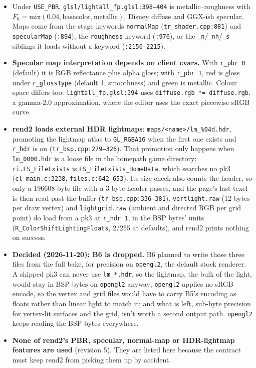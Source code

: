 \documentclass[11pt,a4paper]{article}
\begin{document}
\begin{itemize}
\item Under \texttt{USE\_PBR}, \texttt{glsl/lightall\_fp.glsl:398--404} is metallic--roughness with
  $F_0 = \mathrm{mix}(0.04, \text{basecolor}, \text{metallic})$, Disney diffuse and GGX-ish
  specular. Maps come from the stage keywords \texttt{normalMap} (\texttt{tr\_shader.cpp:881}) and
  \texttt{specularMap} (\texttt{:894}), the \texttt{roughness} keyword (\texttt{:976}), or the
  \texttt{\_n}/\texttt{\_nh}/\texttt{\_s} siblings it loads without a keyword (\texttt{:2150--2215}).
\item \textbf{Specular map interpretation depends on client cvars.} With \texttt{r\_pbr 0} (default)
  it is RGB reflectance plus alpha gloss; with \texttt{r\_pbr 1}, red is gloss under
  \texttt{r\_glossType} (default 1, smoothness) and green is metallic. Colour space differs too:
  \texttt{lightall\_fp.glsl:394} uses \texttt{diffuse.rgb *= diffuse.rgb}, a gamma-2.0
  approximation, where the editor uses the exact piecewise sRGB curve.
\item \textbf{rend2 loads external HDR lightmaps}: \texttt{maps/<name>/lm\_\%04d.hdr},
  promoting the lightmap atlas to \texttt{GL\_RGBA16} when the first one exists and \texttt{r\_hdr}
  is on (\texttt{tr\_bsp.cpp:279--326}). That promotion only happens when \texttt{lm\_0000.hdr}
  is a loose file in the homepath game directory: \texttt{ri.FS\_FileExists} is
  \texttt{FS\_FileExists\_HomeData}, which searches no pk3 (\texttt{cl\_main.c:3238},
  \texttt{files.c:642--653}). Its size check also counts the header, so only a 196608-byte file
  with a 3-byte header passes, and the page's last texel is then read past the buffer
  (\texttt{tr\_bsp.cpp:336--381}). \texttt{vertlight.raw} (12 bytes per draw vertex) and
  \texttt{lightgrid.raw} (ambient and directed RGB per grid point) do load from a pk3 at
  \texttt{r\_hdr 1}, in the BSP bytes' units (\texttt{R\_ColorShiftLightingFloats}, 2/255 at
  defaults), and rend2 prints nothing on success.
\item \textbf{Decided (2026-11-20): B6 is dropped.} B6 planned to write those three files from
  the full bake, for precision on \texttt{opengl2}, the default stock renderer. A shipped pk3 can
  never use \texttt{lm\_*.hdr}, so the lightmap, the bulk of the light, would stay in BSP bytes on
  \texttt{opengl2} anyway; \texttt{opengl2} applies no sRGB encode, so the vertex and grid files
  would have to carry B5's encoding as floats rather than linear light to match it; and what is left,
  sub-byte precision for vertex-lit surfaces and the grid, isn't worth a second output path.
  \texttt{opengl2} keeps reading the BSP bytes everywhere.
\item \textbf{None of rend2's PBR, specular, normal-map or HDR-lightmap features are used}
  (revision 5). They are listed here because the contract must keep rend2 from picking them up by
  accident.
\end{itemize}
\end{document}
